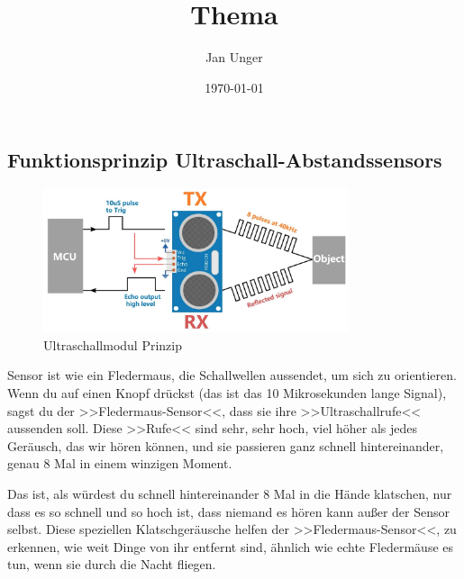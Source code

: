 \documentclass{vorlage-design-main}
\title{Thema}
\author{Jan Unger}
\date{\today}
\begin{document}
\maketitle

\begin{abstract}

\end{abstract}

\hypertarget{funktionsprinzip-ultraschall-abstandssensors}{%
\subsection{Funktionsprinzip
Ultraschall-Abstandssensors}\label{funktionsprinzip-ultraschall-abstandssensors}}

\begin{figure}
\centering
\includegraphics[width=0.8\textwidth]{images/ultrasonic_prin.pdf}
\floatnotes{}
\caption{Ultraschallmodul Prinzip}
\end{figure}

Sensor ist wie ein Fledermaus, die Schallwellen aussendet, um sich zu
orientieren. Wenn du auf einen Knopf drückst (das ist das 10
Mikrosekunden lange Signal), sagst du der >>Fledermaus-Sensor<<, dass
sie ihre >>Ultraschallrufe<< aussenden soll. Diese >>Rufe<< sind sehr,
sehr hoch, viel höher als jedes Geräusch, das wir hören können, und sie
passieren ganz schnell hintereinander, genau 8 Mal in einem winzigen
Moment.

Das ist, als würdest du schnell hintereinander 8 Mal in die Hände
klatschen, nur dass es so schnell und so hoch ist, dass niemand es hören
kann außer der Sensor selbst. Diese speziellen Klatschgeräusche helfen
der >>Fledermaus-Sensor<<, zu erkennen, wie weit Dinge von ihr entfernt
sind, ähnlich wie echte Fledermäuse es tun, wenn sie durch die Nacht
fliegen.
\end{document}
